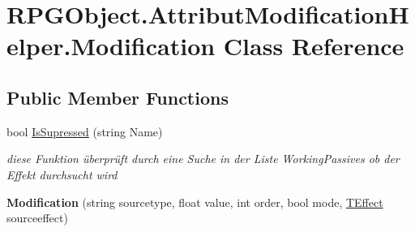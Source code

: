 \hypertarget{class_r_p_g_object_1_1_attribut_modification_helper_1_1_modification}{}\section{R\+P\+G\+Object.\+Attribut\+Modification\+Helper.\+Modification Class Reference}
\label{class_r_p_g_object_1_1_attribut_modification_helper_1_1_modification}
\subsection*{Public Member Functions}
\begin{DoxyCompactItemize}
\item 
bool \hyperlink{class_r_p_g_object_1_1_attribut_modification_helper_1_1_modification_af5220719b5d5a37d3d3d3383ad54c5a4}{Is\+Supressed} (string Name)
\begin{DoxyCompactList}\small\item\em diese Funktion überprüft durch eine Suche in der Liste Working\+Passives ob der Effekt durchsucht wird \end{DoxyCompactList}\item 
\hypertarget{class_r_p_g_object_1_1_attribut_modification_helper_1_1_modification_afa6572bc4595f877a06bb6c5d7d1863c}{}{\bfseries Modification} (string sourcetype, float value, int order, bool mode, \hyperlink{class_t_effect}{T\+Effect} sourceeffect)\label{class_r_p_g_object_1_1_attribut_modification_helper_1_1_modification_afa6572bc4595f877a06bb6c5d7d1863c}

\end{DoxyCompactItemize}
